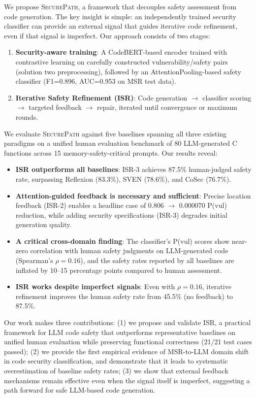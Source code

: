 \documentclass[sigconf,10pt]{acmart}
\begin{document}
We propose \textsc{SecurePath}, a framework that decouples safety assessment from code generation. The key insight is simple: an independently trained security classifier can provide an external signal that guides iterative code refinement, even if that signal is imperfect. Our approach consists of two stages:

\begin{enumerate}
\item \textbf{Security-aware training}: A CodeBERT-based encoder trained with contrastive learning on carefully constructed vulnerability/safety pairs (solution two preprocessing), followed by an AttentionPooling-based safety classifier (F1=0.896, AUC=0.953 on MSR test data).
\item \textbf{Iterative Safety Refinement (ISR)}: Code generation $\rightarrow$ classifier scoring $\rightarrow$ targeted feedback $\rightarrow$ repair, iterated until convergence or maximum rounds.
\end{enumerate}

We evaluate \textsc{SecurePath} against five baselines spanning all three existing paradigms on a unified human evaluation benchmark of 80 LLM-generated C functions across 15 memory-safety-critical prompts. Our results reveal:

\begin{itemize}
\item \textbf{ISR outperforms all baselines}: ISR-3 achieves 87.5\% human-judged safety rate, surpassing Reflexion (83.3\%), SVEN (78.6\%), and CoSec (76.7\%).
\item \textbf{Attention-guided feedback is necessary and sufficient}: Precise location feedback (ISR-2) enables a headline case of 0.806 $\rightarrow$ 0.000070 P(vul) reduction, while adding security specifications (ISR-3) degrades initial generation quality.
\item \textbf{A critical cross-domain finding}: The classifier's P(vul) scores show near-zero correlation with human safety judgments on LLM-generated code (Spearman's $\rho=0.16$), and the safety rates reported by all baselines are inflated by 10--15 percentage points compared to human assessment.
\item \textbf{ISR works despite imperfect signals}: Even with $\rho=0.16$, iterative refinement improves the human safety rate from 45.5\% (no feedback) to 87.5\%.
\end{itemize}

Our work makes three contributions: (1) we propose and validate ISR, a practical framework for LLM code safety that outperforms representative baselines on unified human evaluation while preserving functional correctness (21/21 test cases passed); (2) we provide the first empirical evidence of MSR-to-LLM domain shift in code security classification, and demonstrate that it leads to systematic overestimation of baseline safety rates; (3) we show that external feedback mechanisms remain effective even when the signal itself is imperfect, suggesting a path forward for safe LLM-based code generation.
\end{document}
